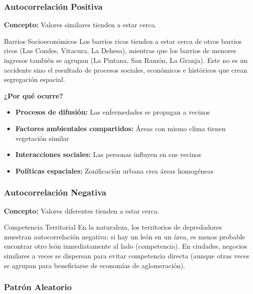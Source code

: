 \documentclass[12pt,a4paper]{article}
\begin{document}
\subsubsection{Autocorrelación Positiva}

\textbf{Concepto:} Valores similares tienden a estar cerca.

\begin{ejemplo}{Barrios Socioeconómicos}
Los barrios ricos tienden a estar cerca de otros barrios ricos (Las Condes, Vitacura, La Dehesa), mientras que los barrios de menores ingresos también se agrupan (La Pintana, San Ramón, La Granja). Este no es un accidente sino el resultado de procesos sociales, económicos e históricos que crean segregación espacial.
\end{ejemplo}

\textbf{¿Por qué ocurre?}
\begin{itemize}
    \item \textbf{Procesos de difusión:} Las enfermedades se propagan a vecinos
    \item \textbf{Factores ambientales compartidos:} Áreas con mismo clima tienen vegetación similar
    \item \textbf{Interacciones sociales:} Las personas influyen en sus vecinos
    \item \textbf{Políticas espaciales:} Zonificación urbana crea áreas homogéneas
\end{itemize}

\subsubsection{Autocorrelación Negativa}

\textbf{Concepto:} Valores diferentes tienden a estar cerca.

\begin{ejemplo}{Competencia Territorial}
En la naturaleza, los territorios de depredadores muestran autocorrelación negativa: si hay un león en un área, es menos probable encontrar otro león inmediatamente al lado (competencia). En ciudades, negocios similares a veces se dispersan para evitar competencia directa (aunque otras veces se agrupan para beneficiarse de economías de aglomeración).
\end{ejemplo}

\subsubsection{Patrón Aleatorio}
\end{document}
